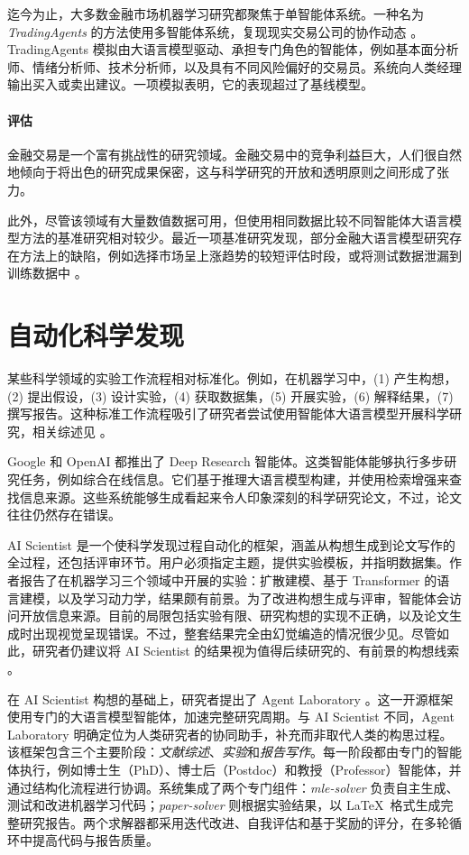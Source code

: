 迄今为止，大多数金融市场机器学习研究都聚焦于单智能体系统。一种名为 {\em TradingAgents} 的方法使用多智能体系统，复现现实交易公司的协作动态 \citep{xiao2024tradingagents}。TradingAgents 模拟由大语言模型驱动、承担专门角色的智能体，例如基本面分析师、情绪分析师、技术分析师，以及具有不同风险偏好的交易员。系统向人类经理输出买入或卖出建议。一项模拟表明，它的表现超过了基线模型。

\paragraph{评估}
金融交易是一个富有挑战性的研究领域。金融交易中的竞争利益巨大，人们很自然地倾向于将出色的研究成果保密，这与科学研究的开放和透明原则之间形成了张力。

此外，尽管该领域有大量数值数据可用，但使用相同数据比较不同智能体大语言模型方法的基准研究相对较少。最近一项基准研究发现，部分金融大语言模型研究存在方法上的缺陷，例如选择市场呈上涨趋势的较短评估时段，或将测试数据泄漏到训练数据中 \citep{li2026can}。

\section{自动化科学发现}
某些科学领域的实验工作流程相对标准化。例如，在机器学习中，(1) 产生构想，(2) 提出假设，(3) 设计实验，(4) 获取数据集，(5) 开展实验，(6) 解释结果，(7) 撰写报告。这种标准工作流程吸引了研究者尝试使用智能体大语言模型开展科学研究，相关综述见 \citet{eger2025transforming}。

Google 和 OpenAI 都推出了 Deep Research 智能体。这类智能体能够执行多步研究任务，例如综合在线信息。它们基于推理大语言模型构建，并使用检索增强来查找信息来源。这些系统能够生成看起来令人印象深刻的科学研究论文，不过，论文往往仍然存在错误。

AI Scientist \citep{lu2024ai} 是一个使科学发现过程自动化的框架，涵盖从构想生成到论文写作的全过程，还包括评审环节。用户必须指定主题，提供实验模板，并指明数据集。作者报告了在机器学习三个领域中开展的实验：扩散建模、基于 Transformer 的语言建模，以及学习动力学，结果颇有前景。为了改进构想生成与评审，智能体会访问开放信息来源。目前的局限包括实验有限、研究构想的实现不正确，以及论文生成时出现视觉呈现错误。不过，整套结果完全由幻觉编造的情况很少见。尽管如此，研究者仍建议将 AI Scientist 的结果视为值得后续研究的、有前景的构想线索 \citep{lu2024ai}。

在 AI Scientist 构想的基础上，研究者提出了 Agent Laboratory \citep{schmidgall2025agent}。这一开源框架使用专门的大语言模型智能体，加速完整研究周期。与 AI Scientist 不同，Agent Laboratory 明确定位为人类研究者的协同助手，补充而非取代人类的构思过程。
该框架包含三个主要阶段：{\em 文献综述}、{\em 实验}和{\em 报告写作}。每一阶段都由专门的智能体执行，例如博士生（PhD）、博士后（Postdoc）和教授（Professor）智能体，并通过结构化流程进行协调。系统集成了两个专门组件：{\em mle-solver} 负责自主生成、测试和改进机器学习代码；{\em paper-solver} 则根据实验结果，以 \LaTeX\ 格式生成完整研究报告。两个求解器都采用迭代改进、自我评估和基于奖励的评分，在多轮循环中提高代码与报告质量。

